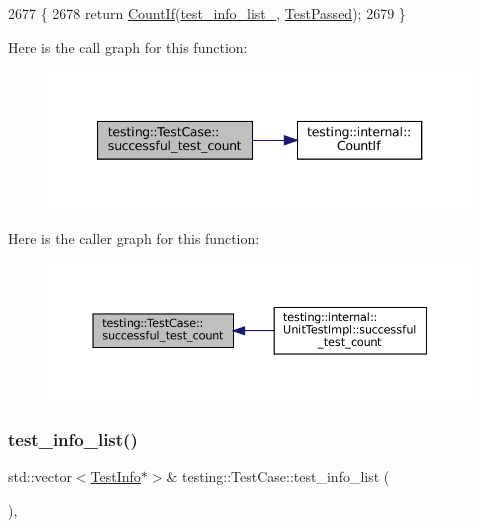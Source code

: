 \begin{DoxyCode}
2677                                           \{
2678   \textcolor{keywordflow}{return} \hyperlink{namespacetesting_1_1internal_a1e77a774d910346eff11a86d8df783a5}{CountIf}(\hyperlink{classtesting_1_1TestCase_adce272a48399dd67a7bdd14fa7e99b80}{test\_info\_list\_}, \hyperlink{classtesting_1_1TestCase_ad8d9e1ebc410000b679002ba71d78686}{TestPassed});
2679 \}
\end{DoxyCode}
Here is the call graph for this function\+:
\nopagebreak
\begin{figure}[H]
\begin{center}
\leavevmode
\includegraphics[width=340pt]{classtesting_1_1TestCase_ab61929942a202f03903182866bd0e086_cgraph}
\end{center}
\end{figure}
Here is the caller graph for this function\+:
\nopagebreak
\begin{figure}[H]
\begin{center}
\leavevmode
\includegraphics[width=350pt]{classtesting_1_1TestCase_ab61929942a202f03903182866bd0e086_icgraph}
\end{center}
\end{figure}
\mbox{\label{classtesting_1_1TestCase_adbfcf952eb18dc82d4b20f6bc31aee04}} 
\subsubsection{\texorpdfstring{test\+\_\+info\+\_\+list()}{test\_info\_list()}\hspace{0.1cm}{\footnotesize\ttfamily [1/2]}}
{\footnotesize\ttfamily std\+::vector$<$\hyperlink{classtesting_1_1TestInfo}{Test\+Info}$\ast$$>$\& testing\+::\+Test\+Case\+::test\+\_\+info\+\_\+list (\begin{DoxyParamCaption}{ }\end{DoxyParamCaption})\hspace{0.3cm}{\ttfamily [inline]}, {\ttfamily [private]}}



